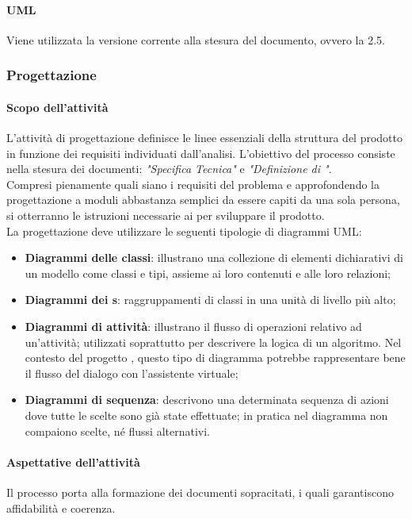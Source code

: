  \paragraph{UML}
 Viene utilizzata la versione corrente alla stesura del documento, ovvero la 2.5.
 \subsubsection{Progettazione}\label{progettazione}
 \paragraph{Scopo dell'attività}
 L'attività di progettazione definisce le linee essenziali della struttura del prodotto  in
 funzione dei requisiti individuati dall'analisi. L'obiettivo del processo consiste nella stesura dei
 documenti: \textit{"Specifica Tecnica"} e \textit{"Definizione di "}. \\
 Compresi pienamente quali siano i requisiti del problema e approfondendo la progettazione a moduli
 abbastanza semplici da essere capiti da una sola persona, si otterranno le
 istruzioni necessarie ai \PRP{} per sviluppare il prodotto.\\
 La progettazione deve utilizzare le seguenti tipologie di diagrammi UML:
 \begin{itemize}
 	\item \textbf{Diagrammi delle classi}: illustrano una collezione di elementi dichiarativi di un modello	come classi e tipi, assieme ai loro contenuti e alle loro relazioni;
 	\item \textbf{Diagrammi dei s}: raggruppamenti di classi in una unità di livello più alto;
 	\item \textbf{Diagrammi di attività}: illustrano il flusso di operazioni relativo ad un’attività; utilizzati	soprattutto per descrivere la logica di un algoritmo. Nel contesto del progetto \PROGETTO, questo tipo di diagramma potrebbe rappresentare bene il flusso del dialogo con l'assistente virtuale;
 	\item \textbf{Diagrammi di sequenza}: descrivono una determinata sequenza di azioni dove tutte le
 	scelte sono già state effettuate; in pratica nel diagramma non compaiono scelte, né flussi
 	alternativi.
 \end{itemize}
 \paragraph{Aspettative dell'attività}
 Il processo porta alla formazione dei documenti sopracitati, i quali garantiscono affidabilità e
 coerenza.
